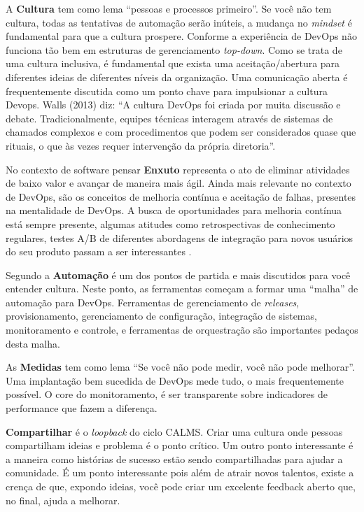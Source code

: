 \documentclass[twoside,english,brazilian]{UNISINOSartigo}
\begin{document}
A \textbf{Cultura} tem como lema ``pessoas e processos primeiro''. Se você não tem cultura, todas as tentativas de automação serão inúteis, a mudança no \textit{mindset} é fundamental para que a cultura prospere. Conforme a experiência de  DevOps não funciona tão bem em estruturas de gerenciamento \textit{top-down}. Como se trata de uma cultura inclusiva, é fundamental que exista uma aceitação/abertura  para diferentes ideias de diferentes níveis da organização. Uma comunicação aberta é frequentemente discutida como um ponto chave para impulsionar a cultura Devops. Walls (2013) diz: ``A cultura DevOps foi criada por muita discussão e debate. Tradicionalmente, equipes técnicas interagem através de sistemas de chamados complexos e com procedimentos que podem ser considerados quase que rituais, o que às vezes requer intervenção da própria diretoria''.

No contexto de software pensar \textbf{Enxuto} representa o ato de eliminar atividades de baixo valor e avançar de maneira mais ágil. Ainda mais relevante no contexto de DevOps, são os conceitos de melhoria contínua e aceitação de falhas, presentes na mentalidade de DevOps. A busca de oportunidades para melhoria contínua está sempre presente, algumas atitudes como retrospectivas de conhecimento regulares, testes A/B de diferentes abordagens de integração para novos usuários do seu produto passam a ser interessantes  \cite{Atlassian2018}.

Segundo  a \textbf{Automação} é um dos pontos de partida e mais discutidos para você entender cultura. Neste ponto, as ferramentas começam a formar uma ``malha'' de automação para DevOps. Ferramentas de gerenciamento de \textit{releases}, provisionamento, gerenciamento de configuração, integração de sistemas, monitoramento e controle, e ferramentas de orquestração são importantes pedaços desta malha.

As \textbf{Medidas} tem como lema ``Se você não pode medir, você não pode melhorar''. Uma implantação bem sucedida de DevOps mede tudo, o mais frequentemente possível. O core do monitoramento, é ser transparente sobre indicadores de performance que fazem a diferença.

\textbf{Compartilhar} é o \textit{loopback} do ciclo CALMS. Criar uma cultura onde pessoas compartilham ideias e problema é o ponto crítico. Um outro ponto interessante é a maneira como histórias de sucesso estão sendo compartilhadas para ajudar a comunidade. É um ponto interessante pois além de atrair novos talentos, existe a crença de que, expondo ideias, você pode criar um excelente feedback aberto que, no final, ajuda a melhorar.
 
\end{document}
